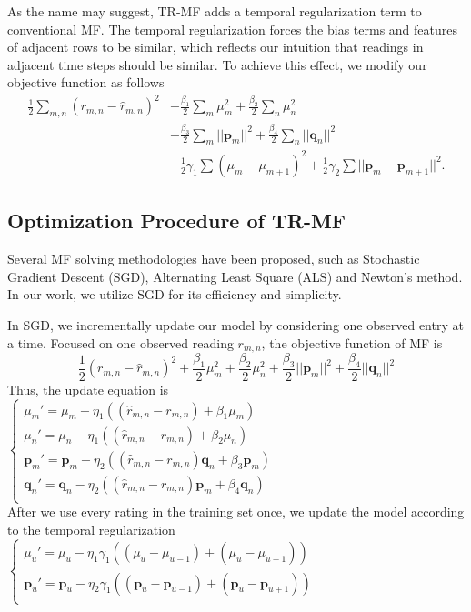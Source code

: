As the name may suggest, TR-MF adds a temporal regularization term to conventional MF.
The temporal regularization forces the bias terms and features of adjacent rows to be similar, which reflects our intuition that readings in adjacent time steps should be similar.
To achieve this effect, we modify our objective function as follows 
\begin{equation*}\begin{aligned}
\frac{1}{2}\sum_{m,n}{(r_{m,n} - \hat{r}_{m,n})}^2 &+ \frac{\beta_1}{2}\sum_m{\mu_m^2} + \frac{\beta_2}{2}\sum_n{\mu_n^2}\\
&+ \frac{\beta_3}{2}\sum_m{||\mathbf{p}_m||^2} + \frac{\beta_4}{2}\sum_n{||\mathbf{q}_n||^2}\\ 
&+ \frac{1}{2}\gamma_1\sum{(\mu_m-\mu_{m+1})^2} + \frac{1}{2}\gamma_2\sum{||\mathbf{p}_m-\mathbf{p}_{m+1}||^2}.
\end{aligned}\end{equation*}

\subsection{Optimization Procedure of TR-MF}
\label{optimation_procedure}
Several MF solving methodologies have been proposed, such as Stochastic Gradient Descent (SGD)\cite{koren2009matrix,chih2008large}, Alternating Least Square (ALS)\cite{koren2009matrix,zhou2008large} and Newton's method\cite{buchanan2005damped}.
In our work, we utilize SGD for its efficiency and simplicity. 

In SGD, we incrementally update our model by considering one observed entry at a time.
Focused on one observed reading $r_{m,n}$, the objective function of MF is
\begin{equation*} \frac{1}{2}(r_{m,n} - \hat{r}_{m,n})^2 + \frac{\beta_1}{2}\mu_m^2 + \frac{\beta_2}{2}\mu_n^2 + \frac{\beta_3}{2}||\mathbf{p}_m||^2 + \frac{\beta_4}{2}||\mathbf{q}_n||^2\end{equation*}
Thus, the update equation is\\
$\begin{cases}
	\mu_m' = \mu_m - \eta_1 ((\hat{r}_{m,n}-r_{m,n}) + \beta_1 \mu_m) \\
	\mu_n' = \mu_n - \eta_1 ((\hat{r}_{m,n}-r_{m,n}) + \beta_2 \mu_n) \\
	\mathbf{p}_{m}' = \mathbf{p}_{m} - \eta_2 ((\hat{r}_{m,n}-r_{m,n})\mathbf{q}_{n} + \beta_3 \mathbf{p}_{m})\\
	\mathbf{q}_{n}' = \mathbf{q}_{n} - \eta_2 ((\hat{r}_{m,n}-r_{m,n})\mathbf{p}_{m} + \beta_4 \mathbf{q}_{n})\\
\end{cases}$\\
After we use every rating in the training set once, we update the model according to the temporal regularization
$\begin{cases}
	\mu_u' = \mu_u - \eta_1 \gamma_1((\mu_u-\mu_{u-1})+(\mu_u-\mu_{u+1}))\\
	\mathbf{p}_{u}' = \mathbf{p}_{u} - \eta_2 \gamma_1((\mathbf{p}_{u}-\mathbf{p}_{u-1})+(\mathbf{p}_{u}-\mathbf{p}_{u+1}))\\
\end{cases}$


